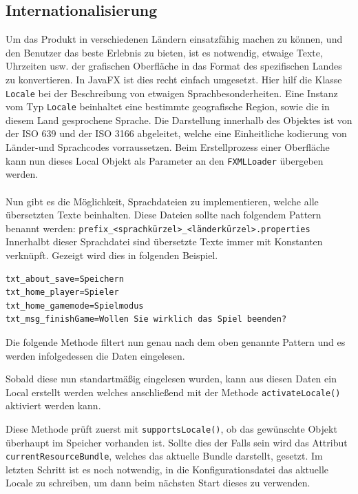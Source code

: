 \subsection{Internationalisierung}\label{sssec:internationalization}
Um das Produkt in verschiedenen Ländern einsatzfähig machen zu können, und den Benutzer das beste Erlebnis zu bieten, ist es notwendig, etwaige Texte, Uhrzeiten usw. der grafischen Oberfläche in das Format des spezifischen Landes zu konvertieren.
In JavaFX ist dies recht einfach umgesetzt.
Hier hilf die Klasse \lstinline[style=java]{Locale} bei der Beschreibung von etwaigen Sprachbesonderheiten.
Eine Instanz vom Typ \lstinline[style=java]{Locale} beinhaltet eine bestimmte geografische Region, sowie die in diesem Land gesprochene Sprache.
Die Darstellung innerhalb des Objektes ist von der ISO 639 und der ISO 3166 abgeleitet, welche eine Einheitliche kodierung von Länder-und Sprachcodes vorraussetzen.
Beim Erstellprozess einer Oberfläche kann nun dieses Local Objekt als Parameter an den \lstinline[style=java]{FXMLLoader} übergeben werden.\\\\
Nun gibt es die Möglichkeit, Sprachdateien zu implementieren, welche alle übersetzten Texte beinhalten.
Diese Dateien sollte nach folgendem Pattern benannt werden: \lstinline[style=java]{prefix_<sprachkürzel>_<länderkürzel>.properties}\\
Innerhalbt dieser Sprachdatei sind übersetzte Texte immer mit Konstanten verknüpft.
Gezeigt wird dies in folgenden Beispiel.
\begin{lstlisting}[style=java,caption=Java-Codebeispiel,label=resource]
txt_about_save=Speichern
txt_home_player=Spieler
txt_home_gamemode=Spielmodus
txt_msg_finishGame=Wollen Sie wirklich das Spiel beenden?
\end{lstlisting}
Die folgende Methode filtert nun genau nach dem oben genannte Pattern und es werden infolgedessen die Daten eingelesen.

Sobald diese nun standartmäßig eingelesen wurden, kann aus diesen Daten ein Local erstellt werden welches anschließend mit der Methode \lstinline[style=java]{activateLocale()} aktiviert werden kann.

Diese Methode prüft zuerst mit \lstinline[style=java]{supportsLocale()}, ob das gewünschte Objekt überhaupt im Speicher vorhanden ist.
Sollte dies der Falls sein wird das Attribut \lstinline[style=java]{currentResourceBundle}, welches das aktuelle Bundle darstellt, gesetzt.
Im letzten Schritt ist es noch notwendig, in die Konfigurationsdatei das aktuelle Locale zu schreiben, um dann beim nächsten Start dieses zu verwenden.
